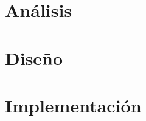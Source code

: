 \documentclass[a4paper, 12pt]{article}
\begin{document}
\newpage
\section{Análisis}

\newpage
\section{Diseño}

\newpage
\section{Implementación}

\printindex
\end{document}
